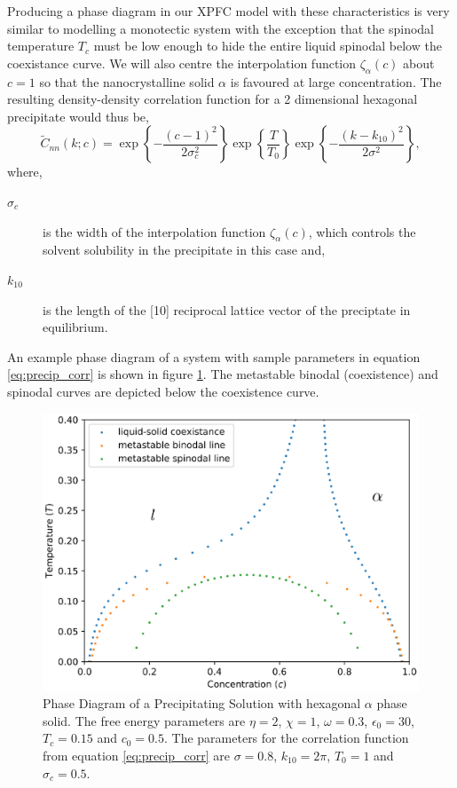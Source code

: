 \documentclass[showkeys, prb, reprint]{revtex4-1}
\renewcommand{\l}{\left}        %
\renewcommand{\r}{\right}       %
\newcommand{\f}{\frac}          %
\begin{document}
Producing a phase diagram in our XPFC model with these characteristics is very
similar to modelling a monotectic system with the exception that the spinodal
temperature $T_c$ must be low enough to hide the entire liquid spinodal below
the coexistance curve.  We will also centre the interpolation function
$\zeta_\alpha(c)$ about $c = 1$ so that the nanocrystalline solid $\alpha$ is
favoured at large concentration. The resulting density-density correlation
function for a 2 dimensional hexagonal precipitate would thus be,
%
\begin{equation}
    \label{eq:precip_corr}
    \tilde{C}_{nn}(k; c) = \exp\l\lbrace - \f{(c - 1)^2}{2\sigma_c^2}\r\rbrace
        \exp\l\lbrace \f{T}{T_0} \r\rbrace 
        \exp\l\lbrace - \f{(k - k_{10})^2}{2\sigma^2} \r\rbrace,
\end{equation}
%
where,
\begin{description}
    \item[$\sigma_c$] is the width of the interpolation function
        $\zeta_\alpha(c)$, which controls the solvent solubility in the
        precipitate in this case and,
    \item[$k_{10}$] is the length of the [10] reciprocal lattice vector of the
        preciptate in equilibrium.
\end{description}

An example phase diagram of a system with sample parameters in equation
\ref{eq:precip_corr} is shown in figure \ref{fig:precip_phase_dia}. The
metastable binodal (coexistence) and spinodal curves are depicted below the
coexistence curve.

\begin{figure}
    \centering	
    \includegraphics[scale=0.5]{solution.eps}
    \caption[Coexistance Phase Diagram with Metastable Spinodal]{
        \label{fig:precip_phase_dia} Phase Diagram of a Precipitating Solution
        with hexagonal $\alpha$ phase solid. The free energy parameters are
        $\eta = 2$, $\chi = 1$, $\omega=0.3$, $\epsilon_0=30$, $T_c = 0.15$ and
        $c_0 = 0.5$. The parameters for the correlation function from equation
        \ref{eq:precip_corr} are $\sigma = 0.8$, $k_{10} = 2\pi$, $T_0 = 1$ and
        $\sigma_c = 0.5$.
    }
\end{figure}
\end{document}
